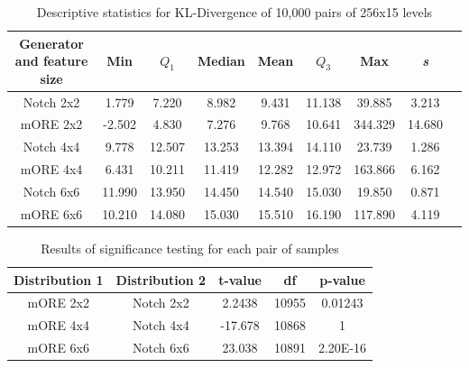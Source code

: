 \begin{table}[ht]
    \centering
    \begin{tabular}{| c | c | c | c | c | c | c | c | c |}\hline
        Generator and feature size & Min & $Q_1$ & Median & Mean & $Q_3$ & Max & \emph{s} \\\hline
        Notch 2x2 & 1.779 & 7.220 & 8.982 & 9.431 & 11.138 & 39.885 & 3.213\\\hline
        mORE 2x2 & -2.502 & 4.830 & 7.276 & 9.768 & 10.641 & 344.329 & 14.680\\\hline
        Notch 4x4 & 9.778 & 12.507 & 13.253 & 13.394 & 14.110 & 23.739 & 1.286\\\hline
        mORE 4x4 & 6.431 & 10.211 & 11.419 & 12.282 & 12.972 & 163.866 & 6.162\\\hline
        Notch 6x6 & 11.990 & 13.950 & 14.450 & 14.540 & 15.030 & 19.850 & 0.871\\\hline
        mORE 6x6 & 10.210 & 14.080 & 15.030 & 15.510 & 16.190 & 117.890 & 4.119\\\hline
    \end{tabular}

    \caption{Descriptive statistics for KL-Divergence of 10,000 pairs of 256x15 levels}
    \label{table:more-ore-desc}
\end{table}

\begin{table}[ht]
\centering
\begin{tabular}{| c | c | c | c | c |}\hline
Distribution 1 & Distribution 2 & t-value & df & p-value \\\hline
mORE 2x2 & Notch 2x2 & 2.2438 & 10955 & 0.01243 \\\hline
mORE 4x4 & Notch 4x4 & -17.678 & 10868 & 1 \\\hline
mORE 6x6 & Notch 6x6 & 23.038 & 10891 & 2.20E-16 \\\hline
\end{tabular}
\caption{Results of significance testing for each pair of samples}
\label{table:t-test}
\end{table}

